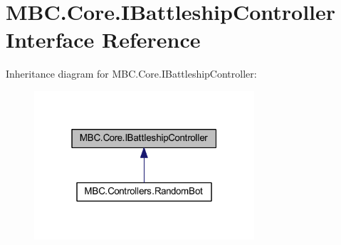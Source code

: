 \hypertarget{interface_m_b_c_1_1_core_1_1_i_battleship_controller}{\section{M\-B\-C.\-Core.\-I\-Battleship\-Controller Interface Reference}
\label{interface_m_b_c_1_1_core_1_1_i_battleship_controller}
}


Inheritance diagram for M\-B\-C.\-Core.\-I\-Battleship\-Controller\-:
\nopagebreak
\begin{figure}[H]
\begin{center}
\leavevmode
\includegraphics[width=232pt]{interface_m_b_c_1_1_core_1_1_i_battleship_controller__inherit__graph}
\end{center}
\end{figure}
